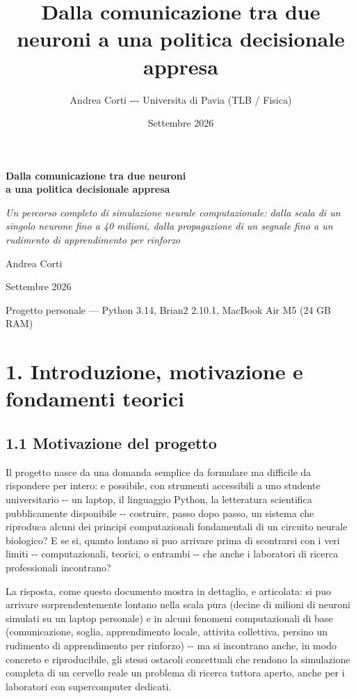 \documentclass[
  italian,
]{article}
\title{Dalla comunicazione tra due neuroni a una politica decisionale appresa}
\author{Andrea Corti -\/-\/- Universita\textquotesingle{} di Pavia (TLB / Fisica)}
\date{Settembre 2026}
\begin{document}
\maketitle

{
\setcounter{tocdepth}{2}
\tableofcontents
}
\textbf{Dalla comunicazione tra due neuroni\\
a una politica decisionale appresa}

\emph{Un percorso completo di simulazione neurale computazionale: dalla scala di un singolo neurone fino a 40 milioni, dalla propagazione di un segnale fino a un rudimento di apprendimento per rinforzo}

Andrea Corti

Settembre 2026

Progetto personale --- Python 3.14, Brian2 2.10.1, MacBook Air M5 (24 GB RAM)

\section{1. Introduzione, motivazione e fondamenti teorici}\label{introduzione-motivazione-e-fondamenti-teorici}

\subsection{1.1 Motivazione del progetto}\label{motivazione-del-progetto}

Il progetto nasce da una domanda semplice da formulare ma difficile da rispondere per intero: e\textquotesingle{} possibile, con strumenti accessibili a uno studente universitario -\/- un laptop, il linguaggio Python, la letteratura scientifica pubblicamente disponibile -\/- costruire, passo dopo passo, un sistema che riproduca alcuni dei principi computazionali fondamentali di un circuito neurale biologico? E se si\textquotesingle, quanto lontano si puo\textquotesingle{} arrivare prima di scontrarsi con i veri limiti -\/- computazionali, teorici, o entrambi -\/- che anche i laboratori di ricerca professionali incontrano?

La risposta, come questo documento mostra in dettaglio, e\textquotesingle{} articolata: si puo\textquotesingle{} arrivare sorprendentemente lontano nella scala pura (decine di milioni di neuroni simulati su un laptop personale) e in alcuni fenomeni computazionali di base (comunicazione, soglia, apprendimento locale, attivita\textquotesingle{} collettiva, persino un rudimento di apprendimento per rinforzo) -\/- ma si incontrano anche, in modo concreto e riproducibile, gli stessi ostacoli concettuali che rendono la simulazione completa di un cervello reale un problema di ricerca tuttora aperto, anche per i laboratori con supercomputer dedicati.
\end{document}

